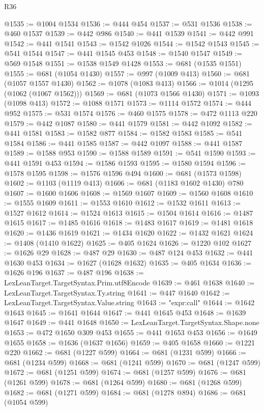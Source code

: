 \begin{lexlean}{R36}
\begin{coremodule}
@1535 := @1004 @1534
@1536 := @444 @454
@1537 := @531 @1536
@1538 := @460 @1537
@1539 := @442 @986
@1540 := @441 @1539
@1541 := @442 @991
@1542 := @441 @1541
@1543 := @1542 @1026
@1544 := @1542 @1543
@1545 := @541 @1544
@1547 := @441 @1545 @453
@1548 := @1540 @1547
@1549 := @569 @1548
@1551 := @1538 @1549 @1428
@1553 := @681 (@1535 @1551)
@1555 := @681 (@1054 @1430)
@1557 := @997 (@1009 @413)
@1560 := @681 (@1057 @1557 @1430)
@1562 := @1078 (@1083 @413)
@1566 := @1014 (@1295 (@1062 (@1067 @1562)))
@1569 := @681 (@1073 @1566 @1430)
@1571 := @1093 (@1098 @413)
@1572 := @1088 @1571
@1573 := @1114 @1572
@1574 := @444 @952
@1575 := @531 @1574
@1576 := @460 @1575
@1578 := @472 @1113 @220
@1579 := @442 @1087
@1580 := @441 @1579
@1581 := @442 @1092
@1582 := @441 @1581
@1583 := @1582 @877
@1584 := @1582 @1583
@1585 := @541 @1584
@1586 := @441 @1585
@1587 := @442 @1097
@1588 := @441 @1587
@1589 := @1588 @953
@1590 := @1588 @1589
@1591 := @541 @1590
@1593 := @441 @1591 @453
@1594 := @1586 @1593
@1595 := @1580 @1594
@1596 := @1578 @1595
@1598 := @1576 @1596 @494
@1600 := @681 (@1573 @1598)
@1602 := @1103 (@1119 @413)
@1606 := @681 (@1183 @1602 @1430) @780
@1607 := @1600 @1606
@1608 := @1569 @1607
@1609 := @1560 @1608
@1610 := @1555 @1609
@1611 := @1553 @1610
@1612 := @1532 @1611
@1613 := @1527 @1612
@1614 := @1524 @1613
@1615 := @1504 @1614
@1616 := @1487 @1615
@1617 := @1485 @1616
@1618 := @1483 @1617
@1619 := @1481 @1618
@1620 := @1436 @1619
@1621 := @1434 @1620
@1622 := @1432 @1621
@1624 := @1408 (@1410 @1622)
@1625 := @405 @1624
@1626 := @1220 @102
@1627 := @1626 @29
@1628 := @487 @29
@1630 := @487 @124 @453
@1632 := @441 @1630 @453
@1634 := @1627 (@1628 @1632)
@1635 := @405 @1634
@1636 := @1626 @196
@1637 := @487 @196
@1638 := LexLeanTarget.TargetSyntax.Prim.utf8Encode
@1639 := @461 @1638
@1640 := LexLeanTarget.TargetSyntax.Ty.string
@1641 := @447 @1640
@1642 := LexLeanTarget.TargetSyntax.Value.string
@1643 := "expr:call"
@1644 := @1642 @1643
@1645 := @1641 @1644
@1647 := @441 @1645 @453
@1648 := @1639 @1647
@1649 := @441 @1648
@1650 := LexLeanTarget.TargetSyntax.Shape.none
@1653 := @472 @1650 @309 @453
@1655 := @441 @1653 @453
@1656 := @1649 @1655
@1658 := @1636 (@1637 @1656)
@1659 := @405 @1658
@1660 := @1221 @220
@1662 := @681 (@1227 @599)
@1664 := @681 (@1231 @599)
@1666 := @681 (@1234 @599)
@1668 := @681 (@1241 @599)
@1670 := @681 (@1247 @599)
@1672 := @681 (@1251 @599)
@1674 := @681 (@1257 @599)
@1676 := @681 (@1261 @599)
@1678 := @681 (@1264 @599)
@1680 := @681 (@1268 @599)
@1682 := @681 (@1271 @599)
@1684 := @681 (@1278 @894)
@1686 := @681 (@1054 @599)

\end{coremodule}
\end{lexlean}
